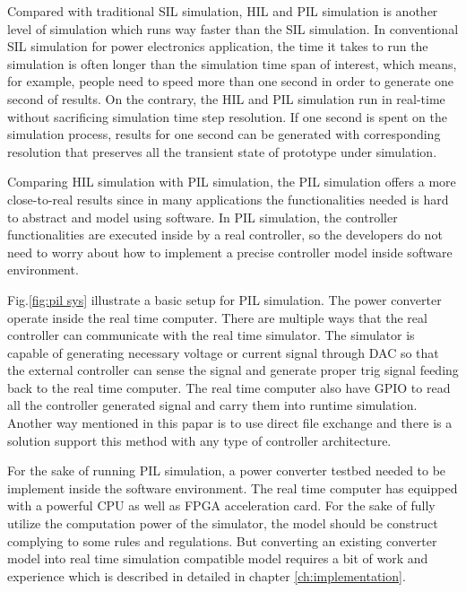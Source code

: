 Compared with traditional \gls{SIL} simulation, \gls{HIL} and \gls{PIL} simulation is another level of simulation which runs way faster than the \gls{SIL} simulation. In conventional \gls{SIL} simulation for power electronics application, the time it takes to run the simulation is often longer than the simulation time span of interest, which means, for example,  people need to speed more than one second in order to generate one second of results. On the contrary, the \gls{HIL} and \gls{PIL} simulation run in real-time without sacrificing simulation time step resolution. If one second is spent on the simulation process, results for one second can be generated with corresponding resolution that preserves all the transient state of prototype under simulation. 

Comparing \gls{HIL} simulation with \gls{PIL} simulation, the \gls{PIL} simulation offers a more close-to-real results since in many applications the functionalities needed is hard to abstract and model using software. In \gls{PIL} simulation, the controller functionalities are executed inside by a real controller, so the developers do not need to worry about how to implement a precise controller model inside software environment.

Fig.\ref{fig:pil sys} illustrate a basic setup for \gls{PIL} simulation. The power converter operate inside the real time computer. There are  multiple ways that the real controller can communicate with the real time simulator. The simulator is capable of generating necessary voltage or current signal through \gls{DAC} so that the external controller can sense the signal and generate proper trig signal feeding back to the real time computer. The real time computer also have \gls{GPIO} to read all the controller generated signal and carry them into runtime simulation. Another way mentioned in this papar\cite{7497546} is to use direct file exchange and there is a solution support this method with any type of controller architecture. 

For the sake of running \gls{PIL} simulation, a power converter testbed needed to be implement inside the software environment. The real time computer has equipped with a powerful \gls{CPU} as well as \gls{FPGA} acceleration card. For the sake of fully utilize the computation power of the simulator, the model should be construct complying to some rules and regulations. But converting an existing converter model into real time simulation compatible model requires a bit of work and experience which is described in detailed in chapter \ref{ch:implementation}.

